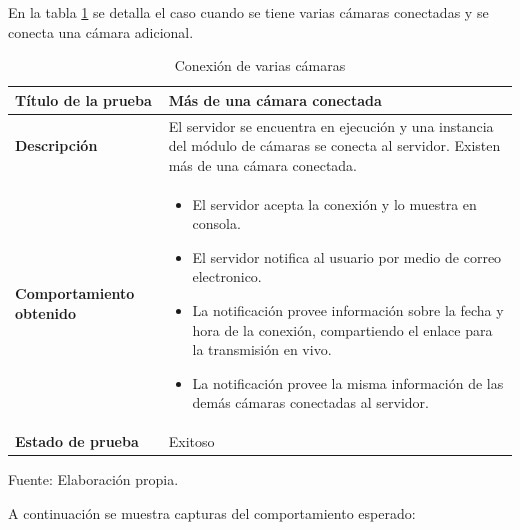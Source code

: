 En la tabla \ref{many_cameras_connected_table} se detalla el caso cuando se tiene varias cámaras conectadas y se conecta una cámara adicional.\\

\begin{table}[H]
    \caption{Conexión de varias cámaras}
    \begin{center}
        \begin{tabular}{|>{\centering}p{}|m{}<{\centering}|} 
            \hline
            \textbf{Título de la prueba} & Más de una cámara conectada \\
            \hline
            \textbf{Descripción} & El servidor se encuentra en ejecución y una instancia del módulo de cámaras se conecta al servidor. Existen más de una cámara conectada.\\
            \hline
            \textbf{Comportamiento obtenido} & 
            \begin{itemize}
                \item El servidor acepta la conexión y lo muestra en consola.
                \item El servidor notifica al usuario por medio de correo electronico.
                \item La notificación provee información sobre la fecha y hora de la conexión, compartiendo el enlace para la transmisión en vivo.
                \item La notificación provee la misma información de las demás cámaras conectadas al servidor.
            \end{itemize} \\ 
            \hline
            \textbf{Estado de prueba} & Exitoso \\
            \hline
        \end{tabular}
        \label{many_cameras_connected_table}
        \begin{center}
            Fuente: Elaboración propia.
        \end{center}
    \end{center}
\end{table}

A continuación se muestra capturas del comportamiento esperado:

